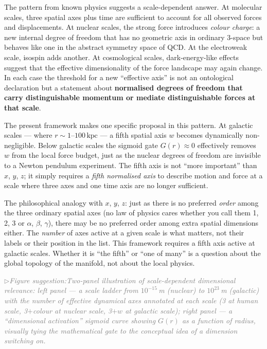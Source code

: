 \documentclass[11pt,a4paper]{article}
\newcommand{\figsuggest}[1]{%
  \medskip
  \noindent\hspace{0pt}\textcolor{gray}{\small\itshape
    $\triangleright$\;Figure suggestion:\enspace #1}%
  \medskip}
\begin{document}
\medskip
\noindent
The pattern from known physics suggests a scale-dependent answer.  At
molecular scales, three spatial axes plus time are sufficient to account
for all observed forces and displacements.  At nuclear scales, the strong
force introduces \emph{colour charge}: a new internal degree of freedom
that has no geometric axis in ordinary 3-space but behaves like one in the
abstract symmetry space of QCD.  At the electroweak scale, isospin adds
another.  At cosmological scales, dark-energy-like effects suggest that
the effective dimensionality of the force landscape may again change.
In each case the threshold for a new ``effective axis'' is not an ontological
declaration but a statement about \textbf{normalised degrees of freedom that
carry distinguishable momentum or mediate distinguishable forces at that
scale}.

\medskip
\noindent
The present framework makes one specific proposal in this pattern.  At
galactic scales --- where $r \sim 1$--$100\,\mathrm{kpc}$ --- a fifth
spatial axis $w$ becomes dynamically non-negligible.  Below galactic scales
the sigmoid gate $G(r) \approx 0$ effectively removes $w$ from the local
force budget, just as the nuclear degrees of freedom are invisible to a
Newton pendulum experiment.  The fifth axis is not ``more important'' than
$x$, $y$, $z$; it simply requires a \emph{fifth normalised axis} to
describe motion and force at a scale where three axes and one time axis
are no longer sufficient.

\medskip
\noindent
The philosophical analogy with $x$, $y$, $z$: just as there is no preferred
\emph{order} among the three ordinary spatial axes (no law of physics cares
whether you call them 1, 2, 3 or $\alpha$, $\beta$, $\gamma$), there may
be no preferred order among extra spatial dimensions either.  The \emph{number}
of axes active at a given scale is what matters, not their labels or their
position in the list.  This framework requires a fifth axis active at
galactic scales.  Whether it is ``the fifth'' or ``one of many'' is a question
about the global topology of the manifold, not about the local physics.

\figsuggest{Two-panel illustration of scale-dependent dimensional relevance:
\emph{left panel} --- a scale ladder from $10^{-15}$\,m (nuclear) to
$10^{23}$\,m (galactic) with the number of effective dynamical axes annotated
at each scale (3 at human scale, 3$+$colour at nuclear scale, 3$+w$ at
galactic scale); \emph{right panel} --- a ``dimensional activation'' sigmoid
curve showing $G(r)$ as a function of radius, visually tying the mathematical
gate to the conceptual idea of a dimension switching on.}
\end{document}
